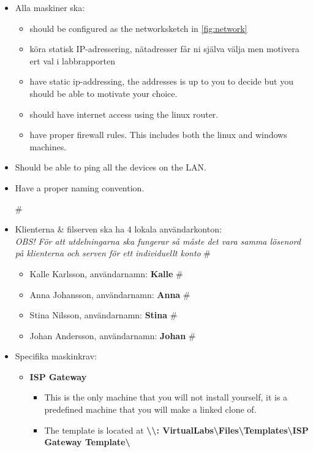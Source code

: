 \documentclass[paper=a4, fontsize=11pt]{report} %
\begin{document}
\begin{itemize}
    \item Alla maskiner ska:
    \begin{itemize}
        \item should be configured as the networksketch in \figurename \ref{fig:network}
        \item köra statisk IP-adressering, nätadresser får ni själva välja men motivera ert val i labbrapporten
        \item have static ip-addressing, the addresses is up to you to decide but you should be able to motivate your choice. 
		\item should have internet access using the linux router.
        \item have proper firewall rules. This includes both the linux and windows machines.
    \end{itemize}
    \item Should be able to ping all the devices on the LAN.
    \item Have a proper naming convention.
    
	#\item Klienterna \& filserven ska ha 4 lokala användarkonton: \\ \textit{OBS! För att utdelningarna ska fungerar så måste det vara samma lösenord på klienterna och serven för ett individuellt konto}
    #\begin{itemize}
    #    \item Kalle Karlsson, användarnamn: \textbf{Kalle}
    #    \item Anna Johansson, användarnamn: \textbf{Anna}
    #    \item Stina Nilsson, användarnamn: \textbf{Stina}
    #    \item Johan Andersson, användarnamn: \textbf{Johan}
    #\end{itemize}
    
	\item Specifika maskinkrav:
    \begin{itemize}
        \item \textbf{ISP Gateway}
        \begin{itemize}
            
			\item This is the only machine that you will not install yourself, it is a predefined machine that you will make a linked clone of.
            \item The template is located at \textbf{\textbackslash\textbackslash: VirtualLabs\textbackslash Files\textbackslash Templates\textbackslash ISP Gateway Template\textbackslash }
        \end{itemize}


\end{itemize}
\end{itemize}
\end{document}
